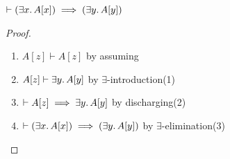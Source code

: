 \begin{node}
$\vdash(\exists x\ldotp A[x])\implies(\exists y\ldotp A[y])$
\end{node}

\begin{proof}
\begin{enumerate}
\item $A[z]\vdash A[z]$ by assuming
\item $A[z]\vdash\exists y\ldotp A[y]$ by $\exists$-introduction(1)
\item $\vdash A[z]\implies\exists y\ldotp A[y]$ by discharging(2)
\item $\vdash(\exists x\ldotp A[x])\implies(\exists y\ldotp A[y])$ by $\exists$-elimination(3)\qedhere
\end{enumerate}
\end{proof}

